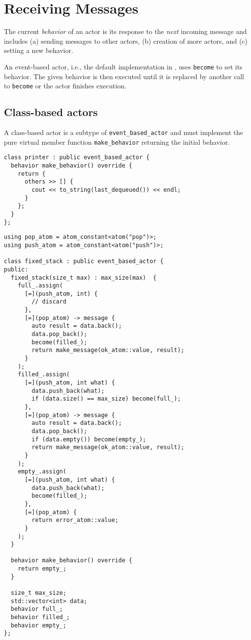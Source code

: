 \section{Receiving Messages}
\label{Sec::Receive}

The current \textit{behavior} of an actor is its response to the \textit{next} incoming message and includes (a) sending messages to other actors, (b) creation of more actors, and (c) setting a new behavior.

An event-based actor, i.e., the default implementation in \lib, uses \lstinline^become^ to set its behavior.
The given behavior is then executed until it is replaced by another call to \lstinline^become^ or the actor finishes execution.

\subsection{Class-based actors}

A class-based actor is a subtype of \lstinline^event_based_actor^ and must implement the pure virtual member function \lstinline^make_behavior^ returning the initial behavior.

\begin{lstlisting}
class printer : public event_based_actor {
  behavior make_behavior() override {
    return {
      others >> [] {
        cout << to_string(last_dequeued()) << endl;
      }
    };
  }
};
\end{lstlisting}

\clearpage
\begin{lstlisting}
using pop_atom = atom_constant<atom("pop")>;
using push_atom = atom_constant<atom("push")>;

class fixed_stack : public event_based_actor {
public:
  fixed_stack(size_t max) : max_size(max)  {
    full_.assign(
      [=](push_atom, int) {
        // discard
      },
      [=](pop_atom) -> message {
        auto result = data.back();
        data.pop_back();
        become(filled_);
        return make_message(ok_atom::value, result);
      }
    );
    filled_.assign(
      [=](push_atom, int what) {
        data.push_back(what);
        if (data.size() == max_size) become(full_);
      },
      [=](pop_atom) -> message {
        auto result = data.back();
        data.pop_back();
        if (data.empty()) become(empty_);
        return make_message(ok_atom::value, result);
      }
    );
    empty_.assign(
      [=](push_atom, int what) {
        data.push_back(what);
        become(filled_);
      },
      [=](pop_atom) {
        return error_atom::value;
      }
    );
  }

  behavior make_behavior() override {
    return empty_;
  }

  size_t max_size;
  std::vector<int> data;
  behavior full_;
  behavior filled_;
  behavior empty_;
};
\end{lstlisting}

